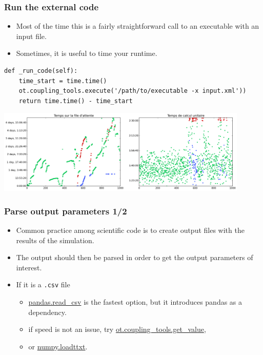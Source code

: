 \documentclass[10pt, aspectratio=169]{beamer}
\begin{document}
\begin{frame}[fragile]
\frametitle{Run the external code}
\begin{itemize}
\item Most of the time this is a fairly straightforward call to an
  executable with an input file.
\item Sometimes, it is useful to time your runtime.
\end{itemize}
\begin{Verbatim}[xleftmargin=10mm]
def _run_code(self):
    time_start = time.time()
    ot.coupling_tools.execute('/path/to/executable -x input.xml'))
    return time.time() - time_start
\end{Verbatim}
\includegraphics[width=0.9\textwidth]{./figure/Temps_DOE_Sobol_1000-white.png}
\end{frame}


\begin{frame}[fragile]
\frametitle{Parse output parameters 1/2}
\begin{itemize}
\item Common practice among scientific code is to create output files with
  the results of the simulation.
\item The output should then be parsed in order to get the output
  parameters of interest.
\item If it is a \texttt{.csv} file
\begin{itemize}
    \item \href{http://pandas.pydata.org/pandas-docs/stable/generated/pandas.read_csv.html}{pandas.read\_csv} is the fastest option, but it introduces pandas as a dependency.
    \item if speed is not an issue, try \href{http://doc.openturns.org/openturns-latest/sphinx/user_manual/_generated/openturns.coupling_tools.get_value.html}{ot.coupling\_tools.get\_value}, 
    \item or \href{http://docs.scipy.org/doc/numpy-1.10.0/reference/generated/numpy.loadtxt.html}{numpy.loadttxt}.
\end{itemize}
\end{itemize}
\end{frame}
\end{document}
